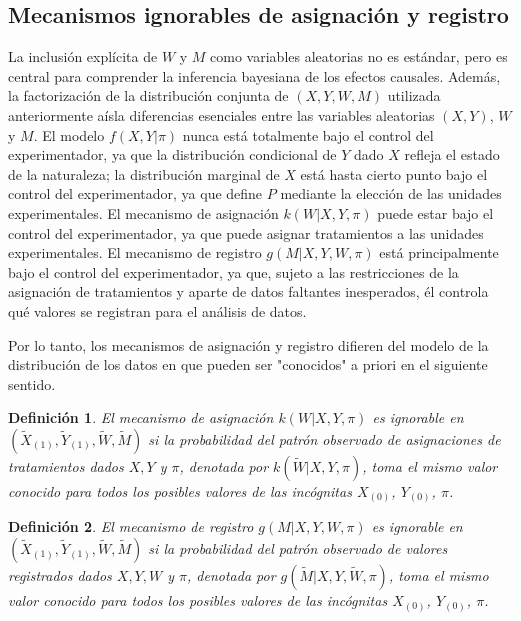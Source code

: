 \documentclass[12pt,a4paper]{article}
\newtheorem{definition}{Definición}
\begin{document}
\subsection{Mecanismos ignorables de asignación y registro}

La inclusión explícita de $W$ y $M$ como variables aleatorias no es estándar, pero es central para comprender la inferencia bayesiana de los efectos causales. Además, la factorización de la distribución conjunta de $(X, Y, W, M)$ utilizada anteriormente aísla diferencias esenciales entre las variables aleatorias $(X, Y)$, $W$ y $M$. El modelo $f(X,Y|\pi)$ nunca está totalmente bajo el control del experimentador, ya que la distribución condicional de $Y$ dado $X$ refleja el estado de la naturaleza; la distribución marginal de $X$ está hasta cierto punto bajo el control del experimentador, ya que define $P$ mediante la elección de las unidades experimentales. El mecanismo de asignación $k(W|X,Y,\pi)$ puede estar bajo el control del experimentador, ya que puede asignar tratamientos a las unidades experimentales. El mecanismo de registro $g(M|X,Y,W,\pi)$ está principalmente bajo el control del experimentador, ya que, sujeto a las restricciones de la asignación de tratamientos y aparte de datos faltantes inesperados, él controla qué valores se registran para el análisis de datos.

Por lo tanto, los mecanismos de asignación y registro difieren del modelo de la distribución de los datos en que pueden ser "conocidos" a priori en el siguiente sentido.

\begin{definition}
El mecanismo de asignación $k(W|X,Y,\pi)$ es ignorable en $(\tilde{X}_{(1)}, \tilde{Y}_{(1)}, \tilde{W}, \tilde{M})$ si la probabilidad del patrón observado de asignaciones de tratamientos dados $X, Y$ y $\pi$, denotada por $k(\tilde{W}|X,Y,\pi)$, toma el mismo valor conocido para todos los posibles valores de las incógnitas $X_{(0)}$, $Y_{(0)}$, $\pi$.
\end{definition}

\begin{definition}
El mecanismo de registro $g(M|X,Y,W,\pi)$ es ignorable en $(\tilde{X}_{(1)}, \tilde{Y}_{(1)}, \tilde{W}, \tilde{M})$ si la probabilidad del patrón observado de valores registrados dados $X, Y, W$ y $\pi$, denotada por $g(\tilde{M}|X,Y,\tilde{W},\pi)$, toma el mismo valor conocido para todos los posibles valores de las incógnitas $X_{(0)}$, $Y_{(0)}$, $\pi$.
\end{definition}
\end{document}
